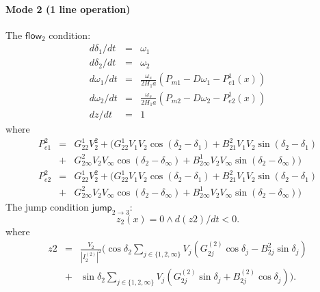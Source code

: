 \documentclass{article}
\newcommand{\flow}{\mathsf{flow}}
\newcommand{\jump}{\mathsf{jump}}
\begin{document}
\paragraph{Mode 2 (1 line operation)}
The $\flow_2$ condition:
\begin{eqnarray*}
d\delta_1/dt &=& \omega_1\\
d\delta_2/dt &=& \omega_2\\
d\omega_1/dt &=& \frac{\omega_s}{2H_1a}(P_{m1} - D\omega_1 - P_{e1}^1(x))\\
d\omega_2/dt &=& \frac{\omega_s}{2H_1a}(P_{m2} - D\omega_2 - P_{e2}^1(x))\\
dz/dt &=& 1
\end{eqnarray*}
where
\begin{eqnarray*}
P_{e1}^2 &=& G_{22}^1V_2^2 + \Big(G_{22}^1 V_1V_2\cos(\delta_2-\delta_1) +
B_{21}^2 V_1V_2\sin(\delta_2-\delta_1)\\
&+& G_{2\infty}^2
V_2V_{\infty}\cos(\delta_2-\delta_{\infty}) + B_{2\infty}^1
V_2V_{\infty}\sin(\delta_2-\delta_{\infty}) \Big)\\
P_{e2}^2 &=& G_{22}^1V_2^2 + \Big(G_{22}^1 V_1V_2\cos(\delta_2-\delta_1) +
B_{21}^2 V_1V_2\sin(\delta_2-\delta_1)\\
&+& G_{2\infty}^2
V_2V_{\infty}\cos(\delta_2-\delta_{\infty}) + B_{2\infty}^1
V_2V_{\infty}\sin(\delta_2-\delta_{\infty}) \Big)
\end{eqnarray*}
The jump condition $\jump_{2 \rightarrow 3}:$
$$z_2(x) = 0 \wedge d(z2)/dt < 0.$$
where
\begin{eqnarray*}
z2 &=& \frac{V_2}{|I_2^(2)|^2}\Big( \cos\delta_2 \sum_{j\in
\{1,2,\infty\}}V_j(G_{2j}^{(2)}\cos\delta_j - B_{2j}^{2}\sin \delta_j)\\
&+&\sin \delta_2 \sum_{j\in \{1,2,\infty\}}V_j(G_{2j}^{(2)}\sin \delta_j +
B_{2j}^{(2)}\cos\delta_j )\Big).
\end{eqnarray*}
\end{document}

